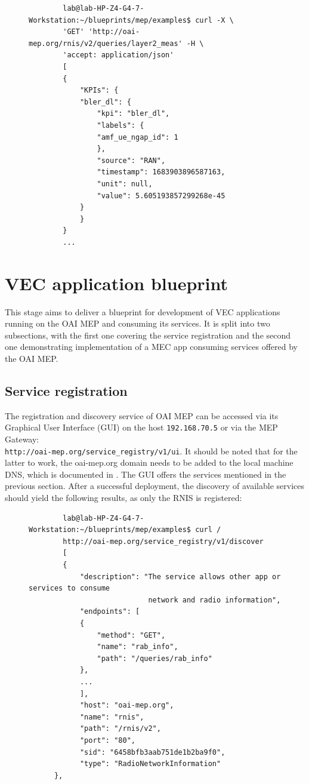 \documentclass[12pt,a4paper,twoside]{report}
\begin{document}
\begin{figure}[H]
	\begin{verbatim}
		lab@lab-HP-Z4-G4-7-Workstation:~/blueprints/mep/examples$ curl -X \
		'GET' 'http://oai-mep.org/rnis/v2/queries/layer2_meas' -H \
		'accept: application/json'
		[
		{
			"KPIs": {
			"bler_dl": {
				"kpi": "bler_dl",
				"labels": {
				"amf_ue_ngap_id": 1
				},
				"source": "RAN",
				"timestamp": 1683903896587163,
				"unit": null,
				"value": 5.605193857299268e-45
			}
			}
		}
		...
	\end{verbatim}
\end{figure}


\section{VEC application blueprint}
This stage aims to deliver a blueprint for development of VEC applications running on the OAI MEP and consuming its services. It is split into two subsections, with the first one covering the service registration and the second one demonstrating implementation of a MEC app consuming services offered by the OAI MEP.
%
\subsection{Service registration}
The registration and discovery service of OAI MEP can be accessed via its Graphical User Interface (GUI) on the host \verb |192.168.70.5| or via the MEP Gateway:\\\verb |http://oai-mep.org/service_registry/v1/ui|. It should be noted that for the latter to work, the oai-mep.org domain needs to be added to the local machine DNS, which is documented in \cite{oai-blueprint-git}. The GUI offers the services mentioned in the previous section. After a successful deployment, the discovery of available services should yield the following results, as only the RNIS is registered:
%
\begin{figure}[ht]
	\begin{verbatim}
		lab@lab-HP-Z4-G4-7-Workstation:~/blueprints/mep/examples$ curl /
		http://oai-mep.org/service_registry/v1/discover 
		[
		{
			"description": "The service allows other app or services to consume
							network and radio information",
			"endpoints": [
			{
				"method": "GET",
				"name": "rab_info",
				"path": "/queries/rab_info"
			},
			...
			],
			"host": "oai-mep.org",
			"name": "rnis",
			"path": "/rnis/v2",
			"port": "80",
			"sid": "6458bfb3aab751de1b2ba9f0",
			"type": "RadioNetworkInformation"
	  },
	\end{verbatim}
\end{figure}
\end{document}
